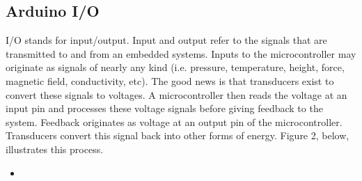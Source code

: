 \documentclass[10pt]{report}
\begin{document}
\subsection*{Arduino I/O}

I/O stands for input/output. Input and output refer to the signals that are transmitted to and from an embedded systems. Inputs to the microcontroller may originate as signals of nearly any kind (i.e. pressure, temperature, height, force, magnetic field, conductivity, etc). The good news is that transducers exist to convert these signals to voltages. A microcontroller then reads the voltage at an input pin and processes these voltage signals before giving feedback to the system. Feedback originates as voltage at an output pin of the microcontroller. Transducers convert this signal back into other forms of energy. Figure 2, below, illustrates this process.


\begin{itemize}
\item 
\end{itemize}
\end{document}
